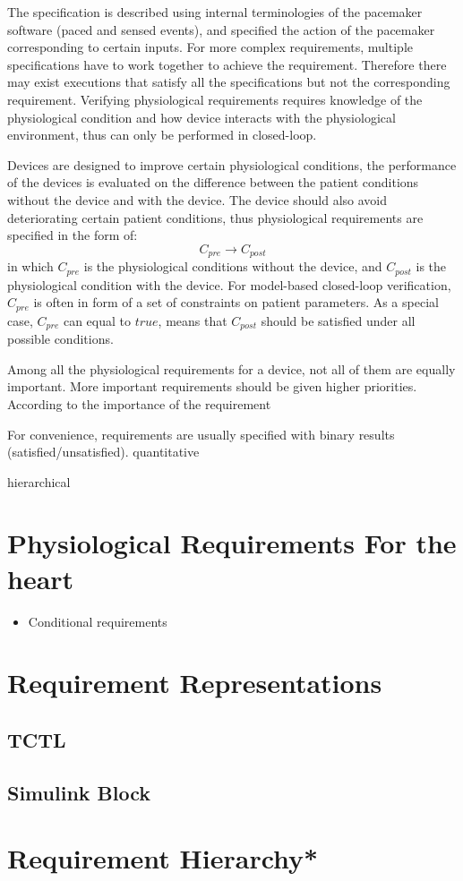 The specification is described using internal terminologies of the pacemaker software (paced and sensed events), and specified the action of the pacemaker corresponding to certain inputs. For more complex requirements, multiple specifications have to work together to achieve the requirement. Therefore there may exist executions that satisfy all the specifications but not the corresponding requirement. Verifying physiological requirements requires knowledge of the physiological condition and how device interacts with the physiological environment, thus can only be performed in closed-loop. 

Devices are designed to improve certain physiological conditions, the performance of the devices is evaluated on the difference between the patient conditions without the device and with the device. The device should also avoid deteriorating certain patient conditions, thus physiological requirements are specified in the form of:
$$C_{pre}\rightarrow C_{post}$$
in which $C_{pre}$ is the physiological conditions without the device,  and $C_{post}$ is the physiological condition with the device. For model-based closed-loop verification, $C_{pre}$ is often in form of a set of constraints on patient parameters. As a special case, $C_{pre}$ can equal to $true$, means that $C_{post}$ should be satisfied under all possible conditions.

Among all the physiological requirements for a device, not all of them are equally important. More important requirements should be given higher priorities. According to the importance of the requirement

For convenience, requirements are usually specified with binary results (satisfied/unsatisfied). quantitative

hierarchical


\section{Physiological Requirements For the heart}
\begin{itemize}
	\item Conditional requirements
\end{itemize}

\section{Requirement Representations}
\subsection{TCTL}
\subsection{Simulink Block}
 
\section{Requirement Hierarchy*}
